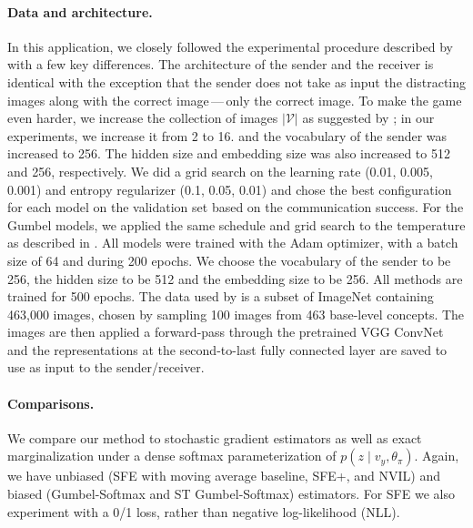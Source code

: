 \paragraph*{Data and architecture.} In this application, we closely
followed the experimental procedure described
by~\citet{Lazaridou2017} with a few key differences. The architecture
of the sender and the receiver is identical with the exception that
the sender does not take as input the distracting images along with
the correct image\,---\,only the correct image. To make the game even
harder, we increase the collection of images $|\mathcal{V}|$ as
suggested by \citet{Havrylov2017}; in our experiments, we increase it
from 2 to 16. and the vocabulary of the sender was increased to 256.
The hidden size and embedding size was also increased to 512 and 256,
respectively. We did a grid search on the learning rate (0.01, 0.005,
0.001) and entropy regularizer (0.1, 0.05, 0.01) and chose the best
configuration for each model on the validation set based on the
communication success. For the Gumbel models, we applied the same
schedule and grid search to the temperature as described in
. All models were trained with the Adam optimizer,
with a batch size of 64 and during 200 epochs. We choose the
vocabulary of the sender to be 256, the hidden size to be 512 and the
embedding size to be 256. All methods are trained for 500 epochs. The
data used by \citet{Lazaridou2017} is a subset of ImageNet containing
463,000 images, chosen by sampling 100 images from 463 base-level
concepts. The images are then applied a forward-pass through the
pretrained VGG ConvNet~\citep{convnet} and the representations at the
second-to-last fully connected layer are saved to use as input to the
sender/receiver.

\paragraph*{Comparisons.} We compare our method to stochastic gradient
estimators as well as exact marginalization under a dense softmax
parameterization of $p (z \mid v_y, \theta_\pi)$. Again, we have
unbiased (SFE with moving average baseline, SFE+, and NVIL) and
biased (Gumbel-Softmax and ST Gumbel-Softmax) estimators. For SFE we
also experiment with a 0/1 loss, rather than negative log-likelihood
(NLL).

